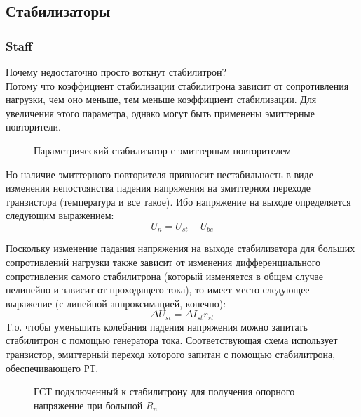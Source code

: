 \subsection{Стабилизаторы}

\subsubsection{Staff}

Почему недостаточно просто воткнут  стабилитрон?\\
Потому что коэффициент стабилизации стабилитрона зависит от сопротивления нагрузки, чем оно меньше, тем меньше коэффициент стабилизации. Для увеличения этого параметра, однако могут быть применены эмиттерные повторители. 

\begin{center}
	\begin{figure}[h!]
		\caption{Параметрический стабилизатор с эмиттерным повторителем}	
	\end{figure}
\end{center}

Но наличие эмиттерного повторителя привносит нестабильность в виде изменения непостоянства падения напряжения на эмиттерном переходе транзистора (температура и все такое). Ибо напряжение на выходе определяется следующим выражением:
\begin{equation}
U_n = U_{st} - U_{be}
\end{equation}

Поскольку изменение падания напряжения на выходе стабилизатора для больших сопротивлений нагрузки также зависит от изменения дифференциального сопротивления самого стабилитрона (который изменяется в общем случае нелинейно и зависит от проходящего тока), то имеет место следующее выражение (с линейной аппроксимацией, конечно):
\begin{equation}
\Delta U_{st} = \Delta I_{st} r_{st}
\end{equation}
Т.о. чтобы уменьшить колебания падения напряжения можно запитать стабилитрон с помощью генератора тока.
Соответствующая схема использует  транзистор, эмиттерный переход которого запитан с помощью стабилитрона, обеспечивающего РТ. 

\begin{center}
	\begin{figure}[h!]
		\caption{ГСТ подключенный к стабилитрону для получения опорного напряжение при большой $R_n$}	
	\end{figure}
\end{center}


